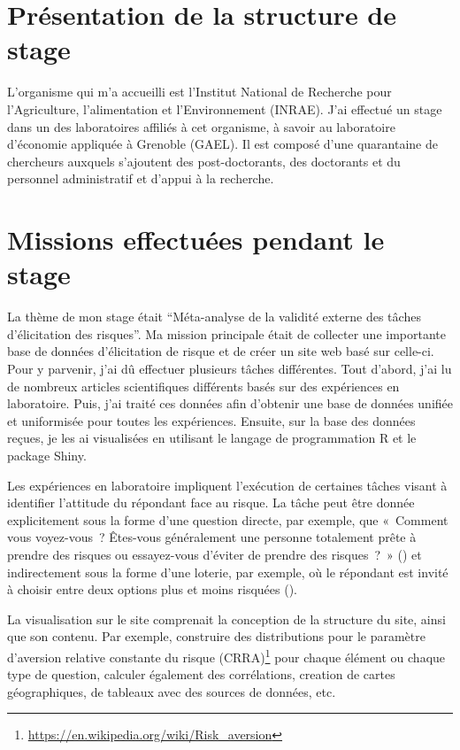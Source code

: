 \documentclass[12pt]{article}
\begin{document}
\section{Présentation de la structure de stage}
\label{sec:second}

L'organisme qui m'a accueilli est l'Institut National de Recherche pour
l'Agriculture, l'alimentation et l'Environnement (INRAE). J'ai effectué
un stage dans un des laboratoires affiliés à cet organisme, à savoir au
laboratoire d'économie appliquée à Grenoble (GAEL). Il est composé d'une
quarantaine de chercheurs auxquels s'ajoutent des post-doctorants, des
doctorants et du personnel administratif et d'appui à la recherche.

\section{Missions effectuées pendant le stage}
\label{sec:third}

La thème de mon stage était ``Méta-analyse de la validité externe des
tâches d'élicitation des risques''. Ma mission principale était de
collecter une importante base de données d'élicitation de risque et de
créer un site web basé sur celle-ci. Pour y parvenir, j'ai dû effectuer
plusieurs tâches différentes. Tout d'abord, j'ai lu de nombreux articles
scientifiques différents basés sur des expériences en laboratoire. Puis,
j'ai traité ces données afin d'obtenir une base de données unifiée et
uniformisée pour toutes les expériences. Ensuite, sur la base des
données reçues, je les ai visualisées en utilisant le langage de
programmation R et le package Shiny.

Les expériences en laboratoire impliquent l'exécution de certaines
tâches visant à identifier l'attitude du répondant face au risque. La
tâche peut être donnée explicitement sous la forme d'une question
directe, par exemple, que «~Comment vous voyez-vous~? Êtes-vous
généralement une personne totalement prête à prendre des risques ou
essayez-vous d'éviter de prendre des risques~?~» (\citet{SOEP2007}) et
indirectement sous la forme d'une loterie, par exemple, où le répondant
est invité à choisir entre deux options plus et moins risquées
(\citet{Holt2002}).

La visualisation sur le site comprenait la conception de la structure du
site, ainsi que son contenu. Par exemple, construire des distributions
pour le paramètre d'aversion relative constante du risque
(CRRA)\footnote{\url{https://en.wikipedia.org/wiki/Risk_aversion}} pour
chaque élément ou chaque type de question, calculer également des
corrélations, creation de cartes géographiques, de tableaux avec des
sources de données, etc.
\end{document}
